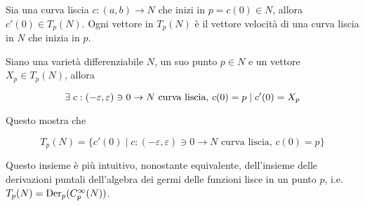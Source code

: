 Sia una curva liscia $ c : (a,b) \to N $ che inizi in $ p = c(0) \in N $, allora $ c'(0) \in T_{p}(N) $. Ogni vettore in $ T_{p}(N) $ è il vettore velocità di una curva liscia in $ N $ che inizia in $ p $.

\begin{definition}
	Siano una varietà differenziabile $ N $, un suo punto $ p \in N $ e un vettore $ X_{p} \in T_{p}(N) $, allora
	
	\begin{equation}
		\exists \; c : (-\varepsilon,\varepsilon) \ni 0 \to N \text{ curva liscia}, \, c(0) = p \mid c'(0) = X_{p}
	\end{equation}

	Questo mostra che
	
	\begin{equation}
		T_{p}(N) = \{ c'(0) \mid c : (-\varepsilon,\varepsilon) \ni 0 \to N \text{ curva liscia}, \, c(0) = p \}
	\end{equation}
\end{definition}

Questo insieme è più intuitivo, nonostante equivalente, dell'insieme delle derivazioni puntali dell'algebra dei germi delle funzioni lisce in un punto $ p $, i.e. $ T_{p}(N) = \operatorname{Der}_{p}(C_{p}^{\infty}(N)) $.

